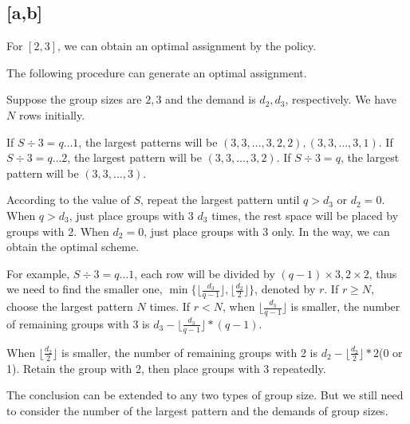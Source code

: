 
\subsection{[a,b]}

\begin{lem}
For $[2,3]$, we can obtain an optimal assignment by the policy.
\end{lem}

The following procedure can generate an optimal assignment.



Suppose the group sizes are $2,3$ and the demand is $d_2,d_3$, respectively. We have $N$ rows initially.

If $S \div 3 = q \ldots 1$, the largest patterns will be $(3,3,\ldots,3,2,2), (3,3,\ldots,3,1)$. %
If $S \div 3 = q \ldots 2$, the largest pattern will be $(3,3,\ldots,3,2)$.
If $S \div 3 = q $, the largest pattern will be $(3,3,\ldots,3)$.

According to the value of $S$, repeat the largest pattern until $q > d_3$ or $d_2 =0$.
When $q > d_3$, just place groups with 3 $d_3$ times, the rest space will be placed by groups with 2. When $d_2 =0$, just place groups with 3 only.
In the way, we can obtain the optimal scheme.

For example, $S \div 3 = q \ldots 1$, each row will be divided by $(q-1)\times 3, 2\times 2$, thus we need to find the smaller one, $\min\{\lfloor\frac{d_3}{q-1}\rfloor, \lfloor\frac{d_2}{2}\rfloor \}$, denoted by $r$. If $r \geq N$, choose the largest pattern $N$ times. If $r< N$, when $\lfloor\frac{d_3}{q-1}\rfloor$ is smaller, the number of remaining groups with 3 is $d_3 - \lfloor\frac{d_3}{q-1}\rfloor * (q-1)$.

When $\lfloor\frac{d_2}{2}\rfloor$ is smaller, the number of remaining groups with 2 is $d_2 - \lfloor\frac{d_2}{2}\rfloor * 2$(0 or 1). Retain the group with 2, then place groups with 3 repeatedly.

The conclusion can be extended to any two types of group size. But we still need to consider the number of the largest pattern and the demands of group sizes.

